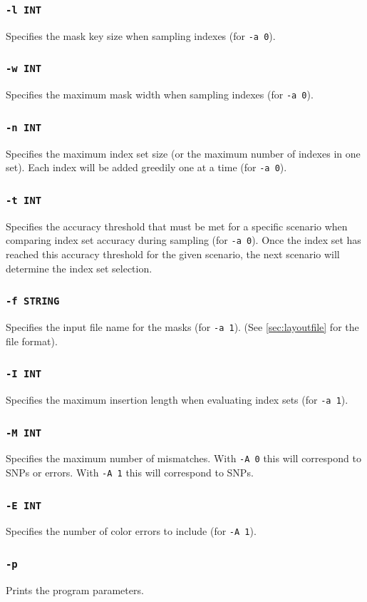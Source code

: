 \documentclass[a4paper,12pt]{book}
\newcommand{\TT}[1]{{\tt #1}} %
\begin{document}
\subsubsection{\TT{-l INT}}
Specifies the mask key size when sampling indexes (for \TT{-a 0}).
\subsubsection{\TT{-w INT}}
Specifies the maximum mask width when sampling indexes (for \TT{-a 0}).
\subsubsection{\TT{-n INT}}
Specifies the maximum index set size (or the maximum number of indexes in one set).
Each index will be added greedily one at a time (for \TT{-a 0}).
\subsubsection{\TT{-t INT}}
Specifies the accuracy threshold that must be met for a specific scenario when comparing index set accuracy during sampling (for \TT{-a 0}).
Once the index set has reached this accuracy threshold for the given scenario, the next scenario will determine the index set selection.
\subsubsection{\TT{-f STRING}}
Specifies the input file name for the masks (for \TT{-a 1}).
(See \autoref{sec:layoutfile} for the file format).
\subsubsection{\TT{-I INT}}
Specifies the maximum insertion length when evaluating index sets (for \TT{-a 1}).
\subsubsection{\TT{-M INT}}
Specifies the maximum number of mismatches.
With \TT{-A 0} this will correspond to SNPs or errors.
With \TT{-A 1} this will correspond to SNPs.
\subsubsection{\TT{-E INT}}
Specifies the number of color errors to include (for \TT{-A 1}).
\subsubsection{\TT{-p}}
Prints the program parameters.
\end{document}
